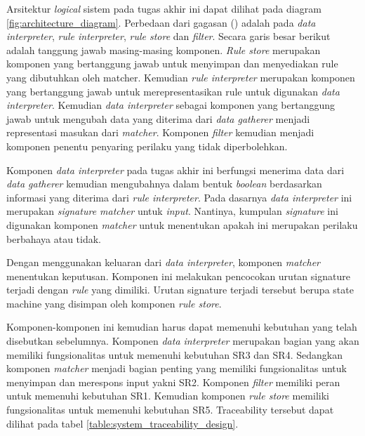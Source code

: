 Arsitektur \textit{logical} sistem pada tugas akhir ini dapat dilihat pada diagram \ref{fig:architecture_diagram}. Perbedaan dari gagasan (\cite{6620049}) adalah pada \textit{data interpreter}, \textit{rule interpreter}, \textit{rule store} dan \textit{filter}. Secara garis besar berikut adalah tanggung jawab masing-masing komponen. \textit{Rule store} merupakan komponen yang bertanggung jawab untuk menyimpan dan menyediakan rule yang dibutuhkan oleh matcher. Kemudian \textit{rule interpreter} merupakan komponen yang bertanggung jawab untuk merepresentasikan rule untuk digunakan \textit{data interpreter}. Kemudian \textit{data interpreter} sebagai komponen yang bertanggung jawab untuk mengubah data yang diterima dari \textit{data gatherer} menjadi representasi masukan dari \textit{matcher}. Komponen \textit{filter} kemudian menjadi komponen penentu penyaring perilaku yang tidak diperbolehkan.

Komponen \textit{data interpreter} pada tugas akhir ini berfungsi menerima data dari \textit{data gatherer} kemudian mengubahnya dalam bentuk \textit{boolean} berdasarkan informasi yang diterima dari \textit{rule interpreter}. Pada dasarnya \textit{data interpreter} ini merupakan \textit{signature matcher} untuk \textit{input}. Nantinya, kumpulan \textit{signature} ini digunakan komponen \textit{matcher} untuk menentukan apakah ini merupakan perilaku berbahaya atau tidak.

Dengan menggunakan keluaran dari \textit{data interpreter}, komponen \textit{matcher} menentukan keputusan. Komponen ini melakukan pencocokan urutan signature terjadi dengan \textit{rule} yang dimiliki. Urutan signature terjadi tersebut berupa state machine yang disimpan oleh komponen \textit{rule store}.

Komponen-komponen ini kemudian harus dapat memenuhi kebutuhan yang telah disebutkan sebelumnya. Komponen \textit{data interpreter} merupakan bagian yang akan memiliki fungsionalitas untuk memenuhi kebutuhan SR3 dan SR4. Sedangkan komponen \textit{matcher} menjadi bagian penting yang memiliki fungsionalitas untuk menyimpan dan merespons input yakni SR2. Komponen \textit{filter} memiliki peran untuk memenuhi kebutuhan SR1. Kemudian komponen \textit{rule store} memiliki fungsionalitas untuk memenuhi kebutuhan SR5. Traceability tersebut dapat dilihat pada tabel \ref{table:system_traceability_design}.

